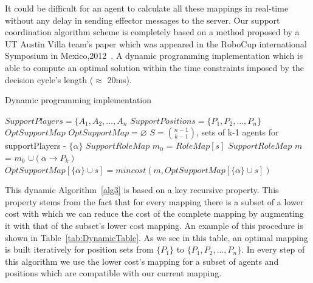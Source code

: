 It could be difficult for an agent to calculate all these mappings in real-time without any delay in sending effector messages to the server. Our support coordination algorithm scheme is completely based on a method proposed by a UT Austin Villa team's paper which was appeared in the RoboCup international Symposium in Mexico,2012~\cite{UtAustinVillaPaper}. A dynamic programming implementation which is able to compute an optimal solution within the time constraints imposed by the decision cycle's length ($\approx$ 20ms).
\begin{algorithm}[ht!]
\caption{Dynamic programming implementation \cite{UtAustinVillaPaper}}
\label{alg3}
\begin{algorithmic}[1]
$SupportPlayers = \lbrace A_{1},A_{2},...,A_{n} $
\STATE $SupportPositions = \lbrace P_{1},P_{2},...,P_{n} \rbrace $
$OptSupportMap$
\STATE $OptSupportMap = \varnothing $
\STATE $ S = {{n-1}\choose{k-1}} $, sets of k-1 agents for supportPlayers - $\lbrace \alpha \rbrace$
\STATE $SupportRoleMap$ $m_{0}$ = $RoleMap[s]$
\STATE $SupportRoleMap$ $m$ = $m_{0}$ $ \cup (\alpha \rightarrow P_{k})$
\STATE $OptSupportMap[\lbrace \alpha \rbrace \cup s] = mincost(m,OptSupportMap[\lbrace \alpha \rbrace \cup s])$
\ENDFOR
\ENDFOR
\ENDFOR
\end{algorithmic}
\end{algorithm}
This dynamic Algorithm~\ref{alg3} is based on a key recursive property. This property stems from the fact that for every mapping there is a subset of a lower cost with which we can reduce the cost of the complete mapping by augmenting it with that of the subset's lower cost mapping. An example of this procedure is shown in Table~\ref{tab:DynamicTable}. As we see in this table, an optimal mapping is built iteratively for position sets from $\lbrace P_{1} \rbrace$ to $\lbrace P_{1},P_{2},...,P_{n} \rbrace$. In every step of this algorithm we use the lower cost's mapping for a subset of agents and positions which are compatible with our current mapping.
